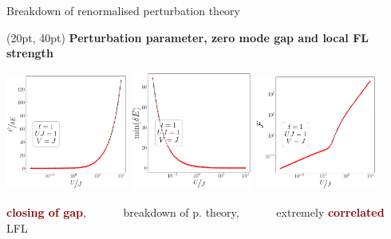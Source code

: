 \documentclass[aspectratio=169]{beamer}
\newcommand{\head}[1]{
\begin{textblock*}{\textwidth}(20pt, 40pt)
\textbf{\Large {#1}}
\end{textblock*}
}
\newcommand{\focus}[1]{\textcolor{maroon}{\textbf{#1}}}
\begin{document}
\begin{frame}[noframenumbering]{Breakdown of renormalised perturbation theory}

\head{Perturbation parameter, zero mode gap and local FL strength}

{
\centering
\includegraphics[width=0.3\textwidth]{figures/par-t=1.000,J=1_over_U,V=J,N=4,U=0.016,100.000,95.pdf}
\hspace*{\fill}
\includegraphics[width=0.3\textwidth]{figures/gap-t=1.000,J=1_over_U,V=J,N=4,U=0.016,100.000,95.pdf}
\hspace*{\fill}
\includegraphics[width=0.3\textwidth]{figures/lfl-t=1.000,J=1_over_U,V=J,N=4,U=0.016,100.000,95.pdf}

\focus{closing of gap},~ ~ ~ ~ breakdown of p. theory,~ ~ ~ ~  extremely \focus{correlated} LFL
}

\end{frame}
\end{document}
